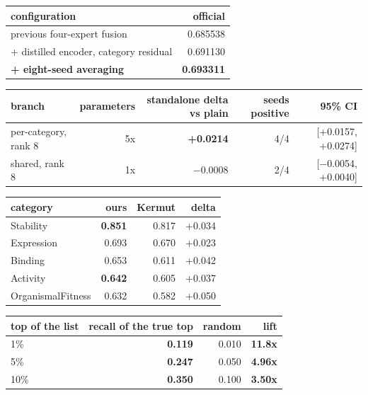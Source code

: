 \documentclass{article}
\begin{document}
\begin{table}[t]
\centering
\small
\begin{tabular}{lr}
\hline
configuration & official \\
\hline
previous four-expert fusion & 0.685538 \\
+ distilled encoder, category residual & 0.691130 \\
\textbf{+ eight-seed averaging} & \textbf{0.693311} \\
\hline
\end{tabular}
\end{table}

\begin{table}[t]
\centering
\small
\begin{tabular}{lrrrr}
\hline
branch & parameters & standalone delta vs plain & seeds positive & 95\% CI \\
\hline
per-category, rank 8 & 5x & \textbf{+0.0214} & 4/4 & [+0.0157, +0.0274] \\
shared, rank 8 & 1x & $-$0.0008 & 2/4 & [$-$0.0054, +0.0040] \\
\hline
\end{tabular}
\end{table}

\begin{table}[t]
\centering
\small
\begin{tabular}{lrrr}
\hline
category & ours & Kermut & delta \\
\hline
Stability & \textbf{0.851} & 0.817 & +0.034 \\
Expression & 0.693 & 0.670 & +0.023 \\
Binding & 0.653 & 0.611 & +0.042 \\
Activity & \textbf{0.642} & 0.605 & +0.037 \\
OrganismalFitness & 0.632 & 0.582 & +0.050 \\
\hline
\end{tabular}
\end{table}

\begin{table}[t]
\centering
\small
\begin{tabular}{lrrr}
\hline
top of the list & recall of the true top & random & lift \\
\hline
1\% & \textbf{0.119} & 0.010 & \textbf{11.8x} \\
5\% & \textbf{0.247} & 0.050 & \textbf{4.96x} \\
10\% & \textbf{0.350} & 0.100 & \textbf{3.50x} \\
\hline
\end{tabular}
\end{table}
\end{document}

